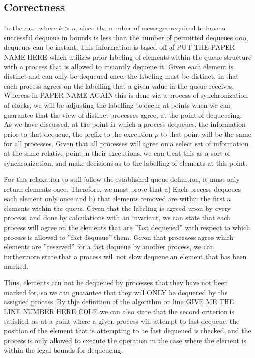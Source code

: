 \documentclass[a4paper,USenglish]{lipics-v2021} %
\begin{document}
\subsection{Correctness}

In the case where $k > n$, since the number of messages required to have a successful dequeue in bounds is less than the number of permitted dequeues ooo, dequeues can be instant. This information is based off of PUT THE PAPER NAME HERE which utilizes prior labeling of elements within the queue structure with a process that is allowed to instantly dequeue it.  Given each element is distinct and can only be dequeued once, the labeling must be distinct, in that each process agrees on the labelling that a given value in the queue receives. Whereas in PAPER NAME AGAIN this is done via a process of synchronization of clocks, we will be adjusting the labelling to occur at points when we can guarantee that the view of distinct processes agree, at the point of dequeueing. As we have discussed, at the point in which a process dequeues, the information prior to that dequeue, the prefix to the execution $\rho$ to that point will be the same for all processes. Given that all processes will agree on a select set of information at the same relative point in their executions, we can treat this as a sort of synchronization, and make decisions as to the labelling of elements at this point.

For this relaxation to still follow the established queue definition, it must only return elements once. Therefore, we must prove that a) Each process dequeues each element only once and b) that elements removed are within the first $n$ elements within the queue.  Given that the labeling is agreed upon by every process, and done by calculations with an invariant, we can state that each process will agree on the elements that are ”fast dequeued” with respect to which process is allowed to ”fast dequeue” them. Given that processes agree which elements are ”reserved” for a fast dequeue by another process, we can furthermore state that a process will not slow dequeue an element that has been marked.

Thus, elements can not be dequeued by processes that they have not been marked for, so we can guarantee that they will ONLY be dequeued by the assigned process.  By thje definition of the algorithm on line GIVE ME THE LINE NUMBER HERE COLE we can also state that the second criterion is satisfied, as at a point where a given process will attempt to fast dequeue, the position of the element that is attempting to be fast dequeued is checked, and the process is only allowed to execute the operation in the case where the element is within the legal bounds for dequeueing.
\end{document}
